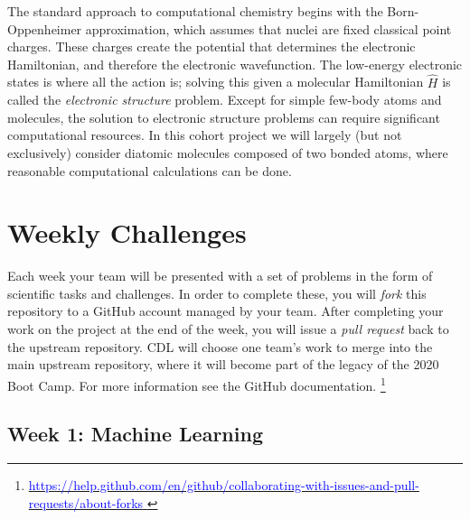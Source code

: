 \documentclass[12pt]{article}
\begin{document}
The standard approach to computational chemistry begins with the Born-Oppenheimer approximation, which assumes that nuclei are fixed classical point charges. These charges create the potential that determines the electronic Hamiltonian, and therefore the electronic wavefunction.
The low-energy electronic states is where all the action is; solving this given a molecular Hamiltonian $\hat{H}$ is
called the {\it electronic structure} problem.
Except for simple few-body atoms and molecules, the solution to electronic structure problems can require significant computational resources.  In this cohort project we will largely
(but not exclusively) consider diatomic molecules composed of two bonded atoms, where reasonable computational calculations can be done.

\newpage

\section{Weekly Challenges}

Each week your team will be presented with a set of problems in the form of scientific tasks and challenges.  In order to complete these, you will {\it fork} this repository to a GitHub account managed by your team.  After completing your work on the project at the end of the week, you will issue a {\it pull request} back to the upstream repository.
CDL will choose one team's work to merge into the main upstream repository, where it will become part of the legacy of the 2020 Boot Camp.  For more information see the
GitHub documentation.
\footnote{
    \href{https://help.github.com/en/github/collaborating-with-issues-and-pull-requests/about-forks}{\textcolor{blue}{https://help.github.com/en/github/collaborating-with-issues-and-pull-requests/about-forks} } }

\subsection{Week 1: Machine Learning}
\end{document}
